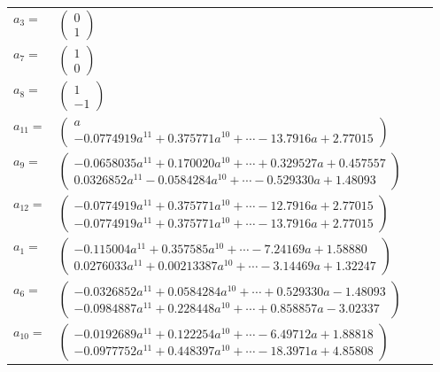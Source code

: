 \documentclass[1p]{elsarticle_modified}
\theoremstyle{definition}
\begin{document}
\begin{tabular}{m{7pt} m{180pt} m{7pt} m{180pt} }
\flushright $a_{3}=$&$\begin{pmatrix}0\\1\end{pmatrix}$ \\
\flushright $a_{7}=$&$\begin{pmatrix}1\\0\end{pmatrix}$ \\
\flushright $a_{8}=$&$\begin{pmatrix}1\\-1\end{pmatrix}$ \\
\flushright $a_{11}=$&$\begin{pmatrix}a\\-0.0774919 a^{11}+0.375771 a^{10}+\cdots-13.7916 a+2.77015\end{pmatrix}$ \\
\flushright $a_{9}=$&$\begin{pmatrix}-0.0658035 a^{11}+0.170020 a^{10}+\cdots+0.329527 a+0.457557\\0.0326852 a^{11}-0.0584284 a^{10}+\cdots-0.529330 a+1.48093\end{pmatrix}$ \\
\flushright $a_{12}=$&$\begin{pmatrix}-0.0774919 a^{11}+0.375771 a^{10}+\cdots-12.7916 a+2.77015\\-0.0774919 a^{11}+0.375771 a^{10}+\cdots-13.7916 a+2.77015\end{pmatrix}$ \\
\flushright $a_{1}=$&$\begin{pmatrix}-0.115004 a^{11}+0.357585 a^{10}+\cdots-7.24169 a+1.58880\\0.0276033 a^{11}+0.00213387 a^{10}+\cdots-3.14469 a+1.32247\end{pmatrix}$ \\
\flushright $a_{6}=$&$\begin{pmatrix}-0.0326852 a^{11}+0.0584284 a^{10}+\cdots+0.529330 a-1.48093\\-0.0984887 a^{11}+0.228448 a^{10}+\cdots+0.858857 a-3.02337\end{pmatrix}$ \\
\flushright $a_{10}=$&$\begin{pmatrix}-0.0192689 a^{11}+0.122254 a^{10}+\cdots-6.49712 a+1.88818\\-0.0977752 a^{11}+0.448397 a^{10}+\cdots-18.3971 a+4.85808\end{pmatrix}$ \\

\end{tabular}
\end{document}
